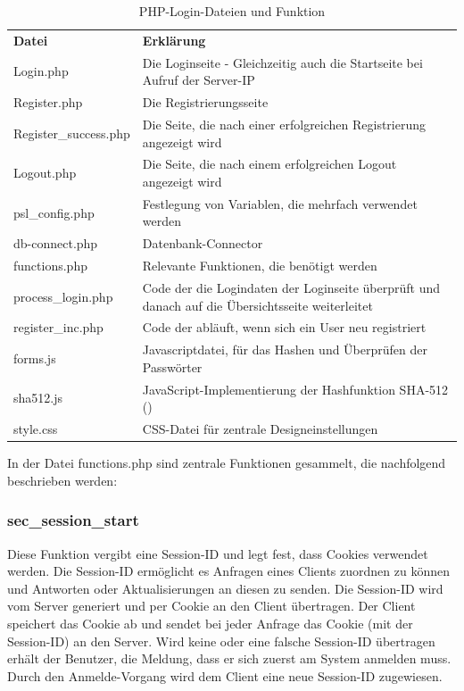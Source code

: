 \begin{table}
\caption{PHP-Login-Dateien und Funktion}
\label{tab:Login-Dateien}
\begin{tabular}{p{} p{}}
\textbf{Datei} 				& \textbf{Erklärung} \\
Login.php 						& Die Loginseite - Gleichzeitig auch die Startseite bei Aufruf der Server-IP\\
Register.php 					& Die Registrierungsseite \\
Register\_success.php & Die Seite, die nach einer erfolgreichen Registrierung angezeigt wird \\
Logout.php 						& Die Seite, die nach einem erfolgreichen Logout angezeigt wird \\
psl\_config.php 			& Festlegung von Variablen, die mehrfach verwendet werden \\
db-connect.php 				& Datenbank-Connector \\
functions.php 				& Relevante Funktionen, die benötigt werden \\
process\_login.php 		& Code der die Logindaten der Loginseite überprüft und danach auf die Übersichtsseite weiterleitet \\
register\_inc.php 				& Code der abläuft, wenn sich ein User neu registriert \\
forms.js 							& Javascriptdatei, für das Hashen und Überprüfen der Passwörter \\
sha512.js 						& JavaScript-Implementierung der Hashfunktion SHA-512 (\cite{sha512js:online})\\
style.css 						& CSS-Datei für zentrale Designeinstellungen \\
 \end{tabular}
\end{table}

In der Datei functions.php sind zentrale Funktionen gesammelt, die nachfolgend
beschrieben werden:

\subsubsection{sec\_session\_start}
Diese Funktion vergibt eine Session-ID und legt fest, dass Cookies verwendet werden. Die Session-ID ermöglicht es Anfragen eines Clients zuordnen zu können und Antworten oder Aktualisierungen an diesen zu senden. Die Session-ID wird vom Server generiert und per Cookie an den Client übertragen. Der Client speichert das Cookie ab und sendet bei jeder Anfrage das Cookie (mit der Session-ID) an den Server. Wird keine oder eine falsche Session-ID übertragen erhält der Benutzer, die Meldung, dass er sich zuerst am System anmelden muss. Durch den Anmelde-Vorgang wird dem Client eine neue Session-ID zugewiesen.

